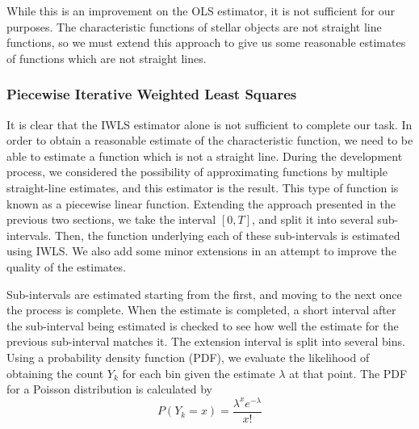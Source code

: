 \documentclass[a4paper,11pt]{article}
\begin{document}
    While this is an improvement on the OLS estimator, it is not sufficient for
    our purposes. The characteristic functions of stellar objects are not
    straight line functions, so we must extend this approach to give us some
    reasonable estimates of functions which are not straight lines.
\subsubsection{Piecewise Iterative Weighted Least Squares}
\label{sec-4-1-3}

    It is clear that the IWLS estimator alone is not sufficient to complete our
    task. In order to obtain a reasonable estimate of the characteristic
    function, we need to be able to estimate a function which is not a straight
    line. During the development process, we considered the possibility of
    approximating functions by multiple straight-line estimates, and this
    estimator is the result. This type of function is known as a piecewise
    linear function. Extending the approach presented in the previous two
    sections, we take the interval $[0,T]$, and split it into several
    sub-intervals. Then, the function underlying each of these sub-intervals is
    estimated using IWLS. We also add some minor extensions in an attempt to
    improve the quality of the estimates.

    Sub-intervals are estimated starting from the first, and moving to the next
    once the process is complete. When the estimate is completed, a short
    interval after the sub-interval being estimated is checked to see how well
    the estimate for the previous sub-interval matches it. The extension
    interval is split into several bins. Using a probability density function
    (PDF), we evaluate the likelihood of obtaining the count $Y_k$ for each bin
    given the estimate $\lambda$ at that point. The PDF for a Poisson
    distribution is calculated by
    \begin{equation}
    P(Y_k=x)=\frac{\lambda^xe^{-\lambda}}{x!}
    \end{equation}
    
\end{document}
